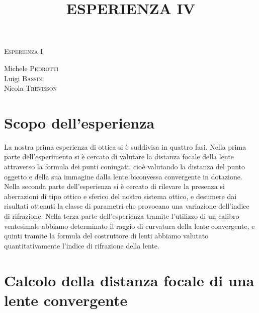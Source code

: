 \documentclass[a4paper,11pt]{article}
\begin{document}
\begin{center}



\textsc{\Huge Esperienza I}\\[0.5cm]



\large
\title{ESPERIENZA IV}

Michele \textsc{Pedrotti}\\
Luigi \textsc{Bassini}\\
Nicola \textsc{Trevisson}\\


\end{center}
\vspace{0.5 cm}
\section{Scopo dell'esperienza}
La nostra prima esperienza di ottica si è suddivisa in quattro fasi. Nella prima parte dell'esperimento si è cercato di valutare la distanza focale della lente attraverso la formula dei punti coniugati, cioè valutando la distanza del punto oggetto e della sua immagine dalla lente biconvessa convergente in dotazione. Nella seconda parte dell'esperienza si è cercato di rilevare la presenza si aberrazioni di tipo ottico e sferico del nostro sistema ottico, e desumere dai risultati ottenuti la classe di parametri che provocano una variazione dell'indice di rifrazione. Nella terza parte dell'esperienza tramite l'utilizzo di un calibro ventesimale abbiamo determinato il raggio di curvatura della lente convergente, e quinti tramite la formula del costruttore di lenti abbiamo valutato quantitativamente l'indice di rifrazione della lente. 

\section{Calcolo della distanza focale di una lente convergente}
\end{document}
